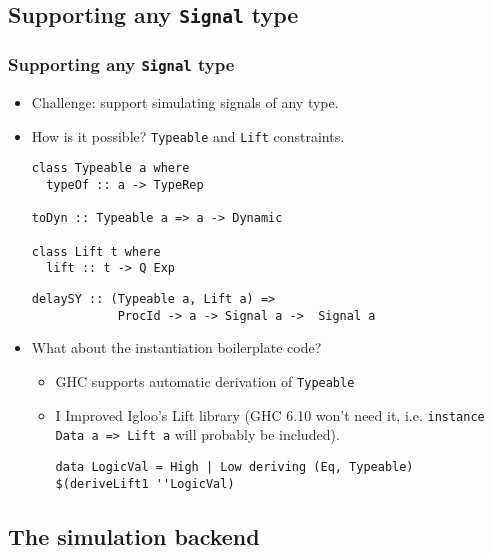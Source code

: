 \documentclass{beamer}
\begin{document}
\subsection{Supporting any \texttt{Signal} type}
\begin{frame}[fragile]
  \frametitle{Supporting any \texttt{Signal} type}
\vspace{-0.2cm}
\begin{itemize}
 \item Challenge: support simulating signals of any type. 
 \item<2-> How is it possible? \texttt{Typeable} and \texttt{Lift} constraints. 
    \begin{lstlisting}
class Typeable a where
  typeOf :: a -> TypeRep

toDyn :: Typeable a => a -> Dynamic

class Lift t where
  lift :: t -> Q Exp
   \end{lstlisting} 

   \begin{lstlisting}
delaySY :: (Typeable a, Lift a) => 
            ProcId -> a -> Signal a ->  Signal a 
   \end{lstlisting}

\item<3-> What about the instantiation boilerplate code? 
 \begin{itemize}
  \item<4-> GHC supports automatic derivation of \texttt{Typeable}
  \item<4-> I Improved Igloo's Lift library (GHC 6.10 won't need it, i.e. \texttt{instance Data a => Lift a} will probably be included).
   \begin{lstlisting}
data LogicVal = High | Low deriving (Eq, Typeable)
$(deriveLift1 ''LogicVal)
   \end{lstlisting}
 \end{itemize} 
\end{itemize}
\end{frame}

\subsection{The simulation backend}
\end{document}
